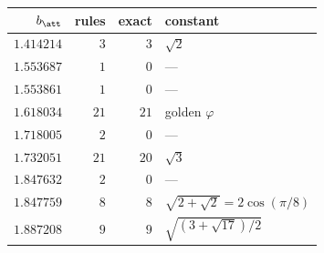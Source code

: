 \begin{tabular}{rrrl}
\hline
$b_\att$ & rules & exact & constant \\
\hline
$1.414214$ & $3$ & $3$ & $\sqrt{2}$ \\
$1.553687$ & $1$ & $0$ & --- \\
$1.553861$ & $1$ & $0$ & --- \\
$1.618034$ & $21$ & $21$ & golden $\varphi$ \\
$1.718005$ & $2$ & $0$ & --- \\
$1.732051$ & $21$ & $20$ & $\sqrt{3}$ \\
$1.847632$ & $2$ & $0$ & --- \\
$1.847759$ & $8$ & $8$ & $\sqrt{2+\sqrt{2}}=2\cos(\pi/8)$ \\
$1.887208$ & $9$ & $9$ & $\sqrt{(3+\sqrt{17})/2}$ \\
\hline
\end{tabular}
